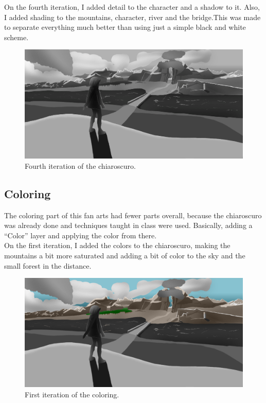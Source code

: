\documentclass{cup-pan}
\begin{document}
        On the fourth iteration, I added detail to the character and a shadow to it. Also, I added shading to the mountains, character, river and the bridge.This was made to separate everything much better than using just a simple black and white scheme.\\
        \begin{figure}[H]
            \includegraphics[width=\textwidth]{Imagenes/Fanart1/Claroscuro/Imagen4.png}
            \caption{Fourth iteration of the chiaroscuro.}
        \end{figure}

    \subsection{Coloring}
        The coloring part of this fan arts had fewer parts overall, because the chiaroscuro was already done and techniques taught in class were used. Basically, adding a “Color” layer and applying the color from there.\\

        On the first iteration, I added the colors to the chiaroscuro, making the mountains a bit more saturated and adding a bit of color  to the sky and the small forest in the distance.\\
        \begin{figure}[H]
            \includegraphics[width=\textwidth]{Imagenes/Fanart1/Color/I_Iteracion.png}
            \caption{First iteration of the coloring.}
        \end{figure}
        
\end{document}
